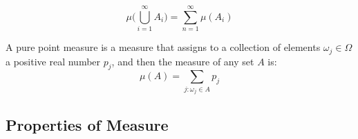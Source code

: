             \begin{equation}
                \mu\Big(\bigcup_{i=1}^{\infty}A_{i}\Big)
                =\sum_{n=1}^{\infty}\mu(A_{i})
            \end{equation}
            \begin{example}
                A pure point measure is a measure that assigns to a
                collection of elements $\omega_{j}\in\Omega$ a positive
                real number $p_{j}$, and then the measure of any set
                $A$ is:
                \begin{equation}
                    \mu(A)=\sum_{j:\omega_{j}\in{A}}p_{j}
                \end{equation}
            \end{example}
            \subsection{Properties of Measure}
